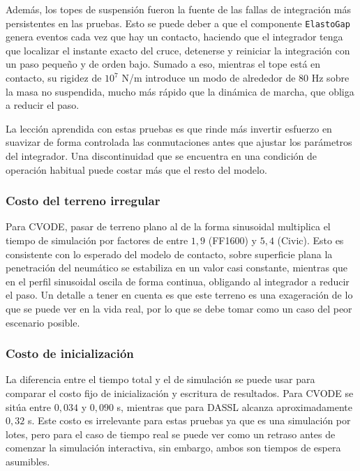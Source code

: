 Además, los topes de suspensión fueron la fuente de las fallas de integración más persistentes en las pruebas. Esto se puede deber a que el componente \verb*|ElastoGap| genera eventos cada vez que hay un contacto, haciendo que el integrador tenga que localizar el instante exacto del cruce, detenerse y reiniciar la integración con un paso pequeño y de orden bajo. Sumado a eso, mientras el tope está en contacto, su rigidez de $10^7$ N/m introduce un modo de alrededor de $80$ Hz sobre la masa no suspendida, mucho más rápido que la dinámica de marcha, que obliga a reducir el paso.

La lección aprendida con estas pruebas es que rinde más invertir esfuerzo en suavizar de forma controlada las conmutaciones antes que ajustar los parámetros del integrador. Una discontinuidad que se encuentra en una condición de operación habitual puede costar más que el resto del modelo.



\subsubsection{Costo del terreno irregular}

Para CVODE, pasar de terreno plano al de la forma sinusoidal multiplica el tiempo de simulación por factores de entre $1{,}9$ (FF1600) y $5{,}4$ (Civic). Esto es consistente con lo esperado del modelo de contacto, sobre superficie plana la penetración del neumático se estabiliza en un valor casi constante, mientras que en el perfil sinusoidal oscila de forma continua, obligando al integrador a reducir el paso. Un detalle a tener en cuenta es que este terreno es una exageración de lo que se puede ver en la vida real, por lo que se debe tomar como un caso del peor escenario posible.

\subsubsection{Costo de inicialización}

La diferencia entre el tiempo total y el de simulación se puede usar para comparar el costo fijo de inicialización y escritura de resultados. Para CVODE se sitúa entre $0{,}034$ y $0{,}090$ s, mientras que para DASSL alcanza aproximadamente $0{,}32$ s. Este costo es irrelevante para estas pruebas ya que es una simulación por lotes, pero para el caso de tiempo real se puede ver como un retraso antes de comenzar la simulación interactiva, sin embargo, ambos son tiempos de espera asumibles.


